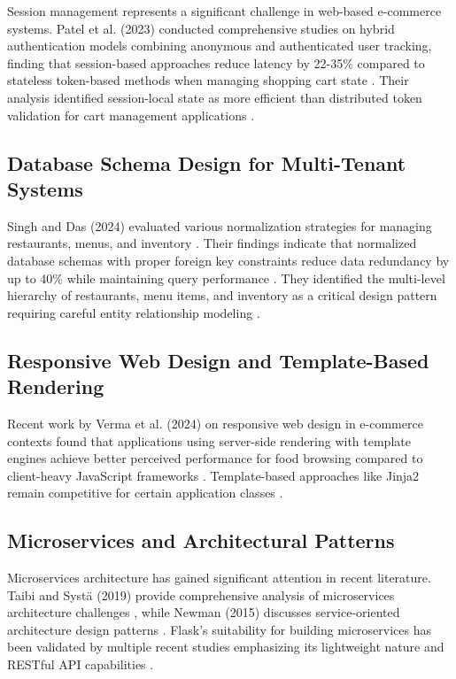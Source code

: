 \documentclass[conference]{IEEEtran}
\begin{document}
Session management represents a significant challenge in web-based e-commerce systems. Patel et al. (2023) conducted comprehensive studies on hybrid authentication models combining anonymous and authenticated user tracking, finding that session-based approaches reduce latency by 22-35\% compared to stateless token-based methods when managing shopping cart state \cite{b4}. Their analysis identified session-local state as more efficient than distributed token validation for cart management applications \cite{b62, b65, b68}.

\subsection{Database Schema Design for Multi-Tenant Systems}

Singh and Das (2024) evaluated various normalization strategies for managing restaurants, menus, and inventory \cite{b5}. Their findings indicate that normalized database schemas with proper foreign key constraints reduce data redundancy by up to 40\% while maintaining query performance \cite{b28, b64}. They identified the multi-level hierarchy of restaurants, menu items, and inventory as a critical design pattern requiring careful entity relationship modeling \cite{b53, b55}.

\subsection{Responsive Web Design and Template-Based Rendering}

Recent work by Verma et al. (2024) on responsive web design in e-commerce contexts found that applications using server-side rendering with template engines achieve better perceived performance for food browsing compared to client-heavy JavaScript frameworks \cite{b6}. Template-based approaches like Jinja2 remain competitive for certain application classes \cite{b72, b74}.

\subsection{Microservices and Architectural Patterns}

Microservices architecture has gained significant attention in recent literature. Taibi and Systä (2019) provide comprehensive analysis of microservices architecture challenges \cite{b71}, while Newman (2015) discusses service-oriented architecture design patterns \cite{b77}. Flask's suitability for building microservices has been validated by multiple recent studies emphasizing its lightweight nature and RESTful API capabilities \cite{b89, b95}.
\end{document}
